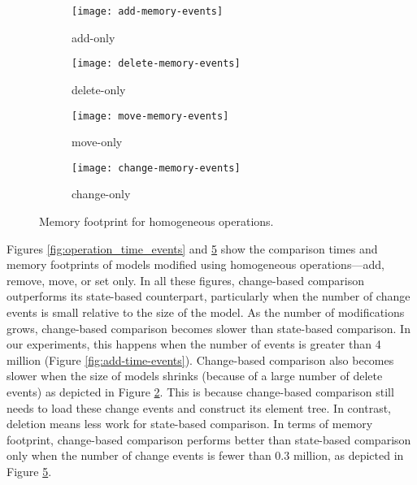 \begin{figure}[ht]
  \centering
  \begin{subfigure}[t]{0.495\linewidth}
    \texttt{[image: add-memory-events]}
    \caption{add-only}
    \label{fig:add-memory-events}
  \end{subfigure}
  \hfill
  \begin{subfigure}[t]{0.495\linewidth}
    \texttt{[image: delete-memory-events]}
    \caption{delete-only}
    \label{fig:delete-memory-events}
  \end{subfigure}
  \begin{subfigure}[t]{0.495\linewidth}
    \texttt{[image: move-memory-events]}
    \caption{move-only}
    \label{fig:move-memory-events}
  \end{subfigure}
  \hfill
  \begin{subfigure}[t]{0.495\linewidth}
    \texttt{[image: change-memory-events]}
    \caption{change-only}
    \label{fig:change-memory-events}
  \end{subfigure}
  \caption{Memory footprint for homogeneous operations.}
  \label{fig:operation_memory_events}
\end{figure}

Figures \ref{fig:operation_time_events} and \ref{fig:operation_memory_events} show the comparison times and memory footprints of models modified using homogeneous operations—\textsf{add}, \textsf{remove}, \textsf{move}, or \textsf{set} only. In all these figures, change-based comparison outperforms its state-based counterpart, particularly when the number of change events is small relative to the size of the model. As the number of modifications grows, change-based comparison becomes slower than state-based comparison. In our experiments, this happens when the number of events is greater than 4 million (Figure \ref{fig:add-time-events}). Change-based comparison also becomes slower when the size of models shrinks (because of a large number of delete events) as depicted in Figure \ref{fig:delete-memory-events}. This is because change-based comparison still needs to load these change events and construct its element tree. In contrast, deletion means less work for state-based comparison. In terms of memory footprint, change-based comparison performs better than state-based comparison only when the number of change events is fewer than 0.3 million, as depicted in Figure \ref{fig:operation_memory_events}.




